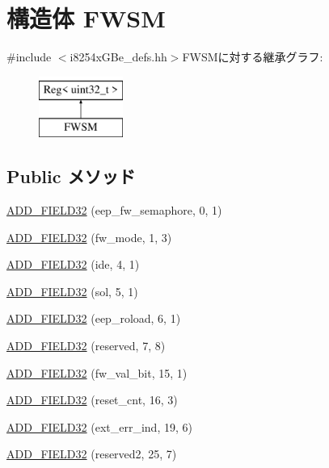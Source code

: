 \hypertarget{structiGbReg_1_1Regs_1_1FWSM}{
\section{構造体 FWSM}
\label{structiGbReg_1_1Regs_1_1FWSM}
}


{\ttfamily \#include $<$i8254xGBe\_\-defs.hh$>$}FWSMに対する継承グラフ:\begin{figure}[H]
\begin{center}
\leavevmode
\includegraphics[height=2cm]{structiGbReg_1_1Regs_1_1FWSM}
\end{center}
\end{figure}
\subsection*{Public メソッド}
\begin{DoxyCompactItemize}
\item 
\hyperlink{structiGbReg_1_1Regs_1_1FWSM_ad310b80fc79de46a5e946865770f3ac8}{ADD\_\-FIELD32} (eep\_\-fw\_\-semaphore, 0, 1)
\item 
\hyperlink{structiGbReg_1_1Regs_1_1FWSM_abd355fa697d2db32722c861022a18e2c}{ADD\_\-FIELD32} (fw\_\-mode, 1, 3)
\item 
\hyperlink{structiGbReg_1_1Regs_1_1FWSM_a31bb991ffc86666cf80a41cea3fb01bf}{ADD\_\-FIELD32} (ide, 4, 1)
\item 
\hyperlink{structiGbReg_1_1Regs_1_1FWSM_a25eaa536dec6a269ff0e837501439656}{ADD\_\-FIELD32} (sol, 5, 1)
\item 
\hyperlink{structiGbReg_1_1Regs_1_1FWSM_a9bba6e9d5e4af7400caf100508ba1d54}{ADD\_\-FIELD32} (eep\_\-roload, 6, 1)
\item 
\hyperlink{structiGbReg_1_1Regs_1_1FWSM_ad0ee8f3bda205a7d7adc7f20cbfc9aeb}{ADD\_\-FIELD32} (reserved, 7, 8)
\item 
\hyperlink{structiGbReg_1_1Regs_1_1FWSM_ad17038adb629c5a7d57c9758316eeb04}{ADD\_\-FIELD32} (fw\_\-val\_\-bit, 15, 1)
\item 
\hyperlink{structiGbReg_1_1Regs_1_1FWSM_a21451cfb8cedd93bd5006481fbeab6b4}{ADD\_\-FIELD32} (reset\_\-cnt, 16, 3)
\item 
\hyperlink{structiGbReg_1_1Regs_1_1FWSM_afec24887168ddc6e5b7c5451af04f460}{ADD\_\-FIELD32} (ext\_\-err\_\-ind, 19, 6)
\item 
\hyperlink{structiGbReg_1_1Regs_1_1FWSM_a0dd6248e12922ab58ea2d7224a815c55}{ADD\_\-FIELD32} (reserved2, 25, 7)
\end{DoxyCompactItemize}


